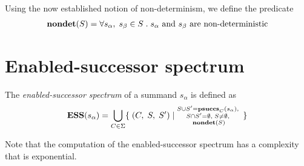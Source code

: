 Using the now established notion of non-determinism, we define the predicate
\begin{align*}
\mathbf{nondet}(S) = \forall s_\alpha,\; s_\beta \in S \; .\; \text{$s_\alpha$ and $s_\beta$ are non-deterministic}
\end{align*}

\section{Enabled-successor spectrum} \label{summand-closure}

The \emph{enabled-successor spectrum} of a summand $s_\alpha$ is defined as
\begin{align*}
\mathbf{ESS}(s_\alpha) = \bigcup\limits_{C \in \Sigma} \{\;(C,\; S,\; {S}^\prime)\;|\;\substack{S \cup {S}^\prime = \mathbf{psuccs}_{C}(s_\alpha),\;\\ S \cap {S}^\prime = \emptyset,\; S \neq \emptyset,\;\\ \mathbf{nondet}(S)}\;\}
\end{align*}

Note that the computation of the enabled-successor spectrum has a complexity that is exponential.

